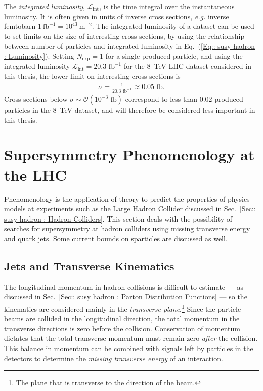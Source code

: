 \documentclass[twoside,english]{uiofysmaster}
\begin{document}
{The \textit{integrated luminosity}, $\mathscr{L}_{\mathrm{int}}$, is the time integral over the instantaneous luminosity. It is often given in units of inverse cross sections, \textit{e.g.} inverse femtobarn $1~\mathrm{fb}^{-1} = 10^{43}~\mathrm{m}^{-2}$. The integrated luminosity of a dataset can be used to set limits on the size of interesting cross sections, by using the relationship between number of particles and integrated luminosity in Eq.~(\ref{Eq:: susy hadron : Luminosity}). Setting $N_{\mathrm{exp}}=1$ for a single produced particle, and using the integrated luminosity $\mathscr{L}_{\mathrm{int}} = 20.3 \text{ fb}^{-1}$ for the 8~TeV LHC dataset considered in this thesis, the lower limit on interesting cross sections is
\begin{align}
\sigma  = \frac{1}{20.3 \text{ fb}^{-1}} \approx 0.05 \text{ fb}.
\end{align}
Cross sections below $\sigma \sim \mathcal{O}(10^{-3} \text{ fb})$ correspond to less than $0.02$ produced particles in the 8~TeV dataset, and will therefore be considered less important in this thesis. 




\section{Supersymmetry Phenomenology at the LHC}

Phenomenology is the application of theory to predict the properties of physics models at experiments such as the Large Hadron Collider discussed in Sec.~\ref{Sec:: susy hadron : Hadron Colliders}. This section deals with the possibility of searches for supersymmetry at hadron colliders using missing transverse energy and quark jets. Some current bounds on sparticles are discussed as well.

\subsection{Jets and Transverse Kinematics}\label{Sec:: susy hadron : Jets and transverse kinematics}

The longitudinal momentum in hadron collisions is difficult to estimate --- as discussed in Sec.~\ref{Sec:: susy hadron : Parton Distribution Functions} --- so the kinematics are considered mainly in the \textit{transverse plane}.\footnote{The plane that is transverse to the direction of the beam.} Since the particle beams are collided in the longitudinal direction, the total momentum in the transverse directions is zero before the collision. Conservation of momentum dictates that the total transverse momentum must remain zero \textit{after} the collision. This balance in momentum can be combined with signals left by particles in the detectors to determine the \textit{missing transverse energy} of an interaction.

}
\end{document}
